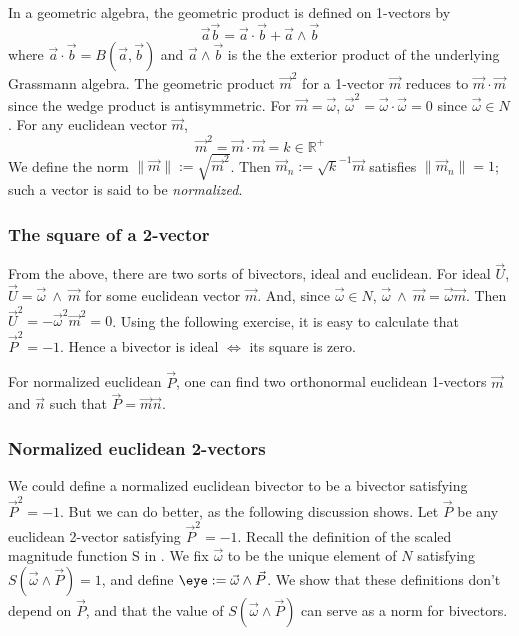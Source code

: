 \documentclass{birkjour}
\newcommand{\mydogblue}{{\color{gray} $\square$~~}}
\begin{document}
In a geometric algebra, the geometric product is defined on 1-vectors by \[\vec{a}\vec{b} = \vec{a}\cdot \vec{b} + \vec{a}\wedge \vec{b}\] where $ \vec{a}\cdot \vec{b} = B(\vec{a},\vec{b})$ and $\vec{a}\wedge \vec{b}$ is the the exterior product of the underlying Grassmann algebra. 
The geometric product $\vec{m}^{2}$ for a 1-vector $\vec{m}$ reduces to $\vec{m} \cdot \vec{m}$ since the wedge product is antisymmetric.  For $\vec{m} = \vec{\omega}$, $\vec{\omega}^{2} = \vec{\omega}\cdot \vec{\omega} = 0$ since $\vec{\omega} \in N$.  For any euclidean vector $\vec{m}$, \[ \vec{m}^{2} = \vec{m} \cdot \vec{m} = k \in \mathbb{R}^{+}\]  We define the norm $\| \vec{m} \| := \sqrt{\vec{m}^{2}}$.  Then $\vec{m}_{n} := \sqrt{k}^{-1}\vec{m}$ satisfies $\| \vec{m}_{n} \| = 1$; such a vector is said to be \emph{normalized}. %

\subsubsection{The square of a 2-vector}
\label{sec:neb}
From the above, there are two sorts of  bivectors, ideal and euclidean.  
 For  ideal $\vec{U}$,  $\vec{U} = \vec{\omega}~ \wedge ~\vec{m} $ for some euclidean vector $\vec{m}$. And, since $\vec{\omega} \in N$, $\vec{\omega}~ \wedge ~\vec{m}= \vec{\omega} \vec{m}$.  Then  $\vec{U}^{2} = -\vec{\omega}^{2} \vec{m}^{2} = 0$.   Using the following exercise, it is easy to calculate that $\vec{P}^{2} = -1$. %
 Hence a bivector is ideal $\iff$ its square is zero.  
 
 \myexercise  For normalized euclidean $\vec{P}$, one can find two orthonormal euclidean 1-vectors $\vec{m}$ and $\vec{n}$ such that $\vec{P} = \vec{m}\vec{n}$. %
 
 

\subsubsection{Normalized euclidean 2-vectors}
We could define a normalized euclidean bivector to be a bivector satisfying  $\vec{P}^{2}=-1$.  But we can do better, as the following discussion shows.  
Let $\vec{P}$ be any euclidean 2-vector satisfying $\vec{P}^{2}=-1$. Recall the definition of the scaled magnitude function S in . We fix $\vec{\omega}$ to be the unique element of $N$ satisfying $S(\vec{\omega} \wedge \vec{P}) = 1$, and define $\eye := \vec{\omega} \wedge \vec{P}$. We show that these definitions don't depend on $\vec{P}$, and that the value of $S(\vec{\omega} \wedge \vec{P})$ can serve as a norm for bivectors.
\end{document}
